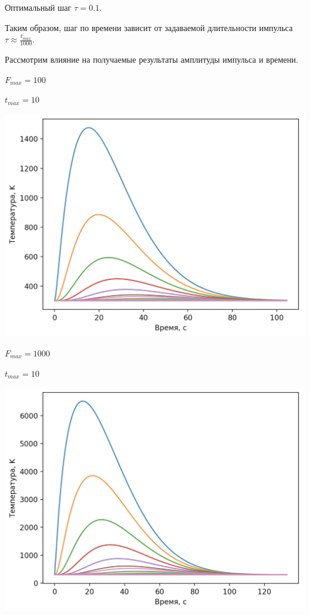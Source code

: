 \documentclass[a4paper,14pt]{extreport} %
\begin{document}
\begin{enumerate}
Оптимальный шаг $\tau=0.1$. 

Таким образом, шаг по времени зависит от задаваемой длительности импульса $\tau \approx \frac{t_{max}}{1000}$. 

\newpage

Рассмотрим влияние на получаемые результаты амплитуды импульса  и  времени. 

$F_{max}=100$

$t_{max}=10$ 

\includegraphics[scale=0.6]{4}

$F_{max}=1000$

$t_{max}=10$ 

\includegraphics[scale=0.6]{5}

\newpage


\end{enumerate}
\end{document}

